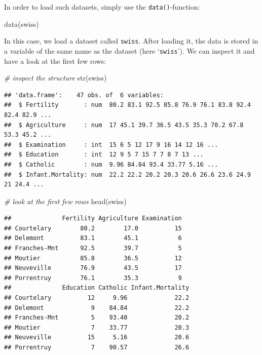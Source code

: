 \documentclass[
  12pt,
]{style/krantz}
\newenvironment{Shaded}{\begin{snugshade}}{\end{snugshade}}
\newcommand{\CommentTok}[1]{\textcolor[rgb]{0.56,0.35,0.01}{\textit{#1}}}
\newcommand{\FunctionTok}[1]{\textcolor[rgb]{0.00,0.00,0.00}{#1}}
\newcommand{\NormalTok}[1]{#1}
\begin{document}
In order to load such datasets, simply use the \texttt{data()}-function:

\begin{Shaded}
\begin{Highlighting}[]
\FunctionTok{data}\NormalTok{(swiss)}
\end{Highlighting}
\end{Shaded}

In this case, we load a dataset called \texttt{swiss}. After loading it, the data is stored in a variable of the same name as the dataset (here `\texttt{swiss}'). We can inspect it and have a look at the first few rows:

\begin{Shaded}
\begin{Highlighting}[]
\CommentTok{\# inspect the structure}
\FunctionTok{str}\NormalTok{(swiss)}
\end{Highlighting}
\end{Shaded}

\begin{verbatim}
## 'data.frame':    47 obs. of  6 variables:
##  $ Fertility       : num  80.2 83.1 92.5 85.8 76.9 76.1 83.8 92.4 82.4 82.9 ...
##  $ Agriculture     : num  17 45.1 39.7 36.5 43.5 35.3 70.2 67.8 53.3 45.2 ...
##  $ Examination     : int  15 6 5 12 17 9 16 14 12 16 ...
##  $ Education       : int  12 9 5 7 15 7 7 8 7 13 ...
##  $ Catholic        : num  9.96 84.84 93.4 33.77 5.16 ...
##  $ Infant.Mortality: num  22.2 22.2 20.2 20.3 20.6 26.6 23.6 24.9 21 24.4 ...
\end{verbatim}

\begin{Shaded}
\begin{Highlighting}[]
\CommentTok{\# look at the first few rows}
\FunctionTok{head}\NormalTok{(swiss)}
\end{Highlighting}
\end{Shaded}

\begin{verbatim}
##              Fertility Agriculture Examination
## Courtelary        80.2        17.0          15
## Delemont          83.1        45.1           6
## Franches-Mnt      92.5        39.7           5
## Moutier           85.8        36.5          12
## Neuveville        76.9        43.5          17
## Porrentruy        76.1        35.3           9
##              Education Catholic Infant.Mortality
## Courtelary          12     9.96             22.2
## Delemont             9    84.84             22.2
## Franches-Mnt         5    93.40             20.2
## Moutier              7    33.77             20.3
## Neuveville          15     5.16             20.6
## Porrentruy           7    90.57             26.6
\end{verbatim}
\end{document}

